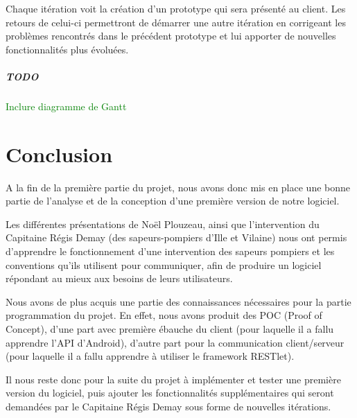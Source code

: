 \documentclass{article}
\newcommand{\todo}[1]{\subparagraph{TODO}\textcolor{green}{#1}}
\begin{document}
Chaque itération voit la création d’un prototype qui sera présenté au client. Les retours de celui-ci permettront de démarrer une autre itération en corrigeant les problèmes rencontrés dans le précédent prototype et lui apporter de nouvelles fonctionnalités plus évoluées.

\todo{Inclure diagramme de Gantt}

\section*{Conclusion}
A la fin de la première partie du projet, nous avons donc mis en place une bonne partie de l’analyse et de la conception d’une première version de notre logiciel.

Les différentes présentations de Noël Plouzeau, ainsi que l’intervention du Capitaine Régis Demay (des sapeurs-pompiers d’Ille et Vilaine) nous ont permis d’apprendre le fonctionnement d’une intervention des sapeurs pompiers et les conventions qu’ils utilisent pour communiquer, afin de produire un logiciel répondant au mieux aux besoins de leurs utilisateurs.

Nous avons de plus acquis une partie des connaissances nécessaires pour la partie programmation du projet. En effet, nous avons produit des POC (Proof of Concept), d’une part  avec première ébauche du client (pour laquelle il a fallu apprendre l’API d’Android), d’autre part pour la communication client/serveur (pour laquelle il a fallu apprendre à utiliser le framework RESTlet).

Il nous reste donc pour la suite du projet à implémenter et tester une première version du logiciel, puis ajouter les fonctionnalités supplémentaires qui seront demandées par le Capitaine Régis Demay sous forme de nouvelles itérations.
\end{document}
